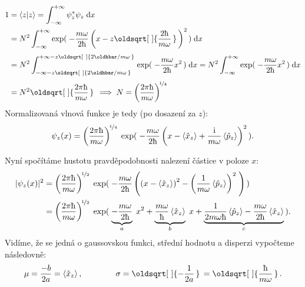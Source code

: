 \documentclass[10pt,a4paper]{article}
\renewcommand*{\sqrt}[2][\ ]{\oldsqrt[#1]{#2\,}\,}
\newcommand{\const}[1]{\text{#1}}
\renewcommand{\d}[1]{\;\const{d}#1}
\newcommand{\braket}[2]{\left< #1 \middle| #2 \right>}
\renewcommand{\i}{\const{i}}
\begin{document}
\begin{align*}
    1 &= \braket{z}{z} = \int_{-\infty}^{+\infty} \psi_z^* \psi_z \d{x}
    \\
    &= N^2 \int_{-\infty}^{+\infty} \exp ( \; { -\frac{m\omega}{2\hbar} \left( x - z \sqrt{\frac{2\hbar}{m\omega}} \right)^2 } \, ) \d{x}
    \\[3pt]
    &= N^2 \int_{-\infty - z \sqrt{2\oldhbar / m\omega}}^{+\infty - z \sqrt{2\oldhbar / m\omega}} \exp ( \; { -\frac{m\omega}{2\hbar} x^2 } \, ) \d{x}
    = N^2 \int_{-\infty}^{+\infty} \exp ( \; { -\frac{m\omega}{2\hbar} x^2 } \, ) \d{x}
    \\[3pt]
    &= N^2 \sqrt{\frac{2\pi\hbar}{m\omega}}
    \implies
    N = \left( \frac{2\pi\hbar}{m\omega} \right)^{\!\nicefrac{1}{4}}
\end{align*}
Normalizovaná vlnová funkce je tedy (po dosazení za $z$):
\begin{align*}
    \psi_z(x) = \left( \frac{2\pi\hbar}{m\omega} \right)^{\!\nicefrac{1}{4}} \; \exp ( \; { -\frac{m\omega}{2\hbar} \left( x - \left< \hat{x}_z \right> + \frac{\i}{m\omega} \left< \hat{p}_z \right> \right)^2 } \, ).
\end{align*}

\vspace{3em}

Nyní spočítáme hustotu pravděpodobnosti nalezení částice v poloze $x$:
\begin{align*}
    | \psi_z(x) |^2
    &= \left( \frac{2\pi\hbar}{m\omega} \right)^{\!\nicefrac{1}{2}} \; \exp ( \; { -\frac{m\omega}{2\hbar} \left( \left( x - \left< \hat{x}_z \right> \right)^2 - \left( \frac{1}{m\omega} \left< \hat{p}_z \right>\right)^2 \; \right) } \, )
    \\
    &= \left( \frac{2\pi\hbar}{m\omega} \right)^{\!\nicefrac{1}{2}} \; \exp ( \; {
        \underbrace{-\frac{m\omega}{2\hbar}}_a \; x^2 +
        \underbrace{\frac{m\omega}{\hbar} \left< \hat{x}_z \right>}_b \; x + \underbrace{\frac{1}{2m\omega\hbar} \left< \hat{p}_z \right> - \frac{m\omega}{2\hbar} \left< \hat{x}_z \right>}_c
    } \, ).
\end{align*}
Vidíme, že se jedná o gaussovskou funkci, střední hodnotu a disperzi vypočteme následovně:
\begin{gather*}
    \mu = \frac{-b}{2a} = \left< \hat{x}_z \right>,
    \hspace{4em}
    \sigma = \sqrt{ -\frac{1}{2a} } = \sqrt{\frac{\hbar}{m\omega}}.
\end{gather*}

\vspace{3em}
\end{document}
